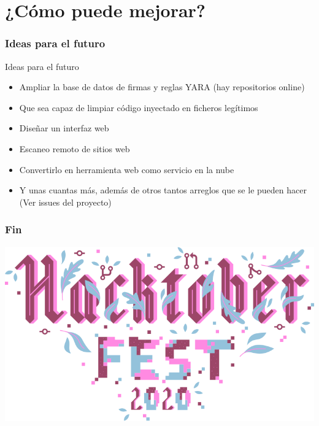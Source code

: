 \documentclass[xcolor={dvipsnames}]{beamer}
\begin{document}
\section{¿Cómo puede mejorar?}
\begin{frame}\frametitle{Ideas para el futuro}
    \begin{block}{Ideas para el futuro}
    \begin{itemize}
        \item Ampliar la base de datos de firmas y reglas YARA (hay repositorios online)
        \item Que sea capaz de limpiar código inyectado en ficheros legítimos
        \item Diseñar un interfaz web
        \item Escaneo remoto de sitios web
        \item Convertirlo en herramienta web como servicio en la nube
        \item Y unas cuantas más, además de otros tantos arreglos que se le pueden hacer (Ver issues del proyecto)
    \end{itemize}
    \end{block}
\end{frame}

\begin{frame}\frametitle{Fin}
    \begin{center}
        \includegraphics[scale=0.3]{hacktoberfest}
     \end{center}
\end{frame}
\end{document}
